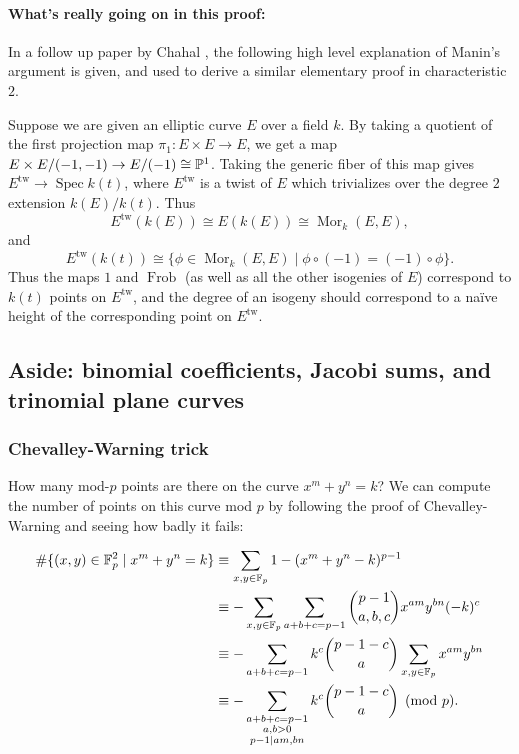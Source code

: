 \documentclass[letterpaper,11pt]{article}
\DeclareMathOperator{\tw}{tw}
\DeclareMathOperator{\Spec}{Spec}
\DeclareMathOperator{\Mor}{Mor}
\DeclareMathOperator{\Frob}{Frob}
\begin{document}
\paragraph{What's really going on in this proof:} In a follow up paper by Chahal \cite{chahal-supplement}, the following high level explanation of Manin's argument is given, and used to derive a similar elementary proof in characteristic $2$.

Suppose we are given an elliptic curve $E$ over a field $k$. By taking a quotient of the first projection map $\pi_1: E\times E \rightarrow E$, we get a map $E\times E/(-1,-1) \rightarrow E/(-1) \cong \mathbb{P}^1$. Taking the generic fiber of this map gives $E^{\tw} \rightarrow \Spec k(t)$, where $E^{\tw}$ is a twist of $E$ which trivializes over the degree $2$ extension $k(E)/k(t)$. Thus
\[
E^{\tw}(k(E)) \cong E(k(E)) \cong \Mor_k(E,E),
\]
and
\[
E^{\tw}(k(t)) \cong \{\phi \in \Mor_k(E,E) \mid \phi\circ(-1) = (-1)\circ\phi\}.
\]
Thus the maps $1$ and $\Frob$ (as well as all the other isogenies of $E$) correspond to $k(t)$ points on $E^{\tw}$, and the degree of an isogeny should correspond to a na\"{i}ve height of the corresponding point on $E^{\tw}$.

\subsection{Aside: binomial coefficients, Jacobi sums, and trinomial plane curves}

\subsubsection{Chevalley-Warning trick}

How many mod-$p$ points are there on the curve $x^m + y^n = k$? We can compute the number of points on this curve mod $p$ by following the proof of Chevalley-Warning and seeing how badly it fails:

\begin{align*}
\#\{(x,y) \in \mathbb{F}_p^2\mid x^m + y^n = k\} &\equiv \sum_{x,y\in \mathbb{F}_p} 1 - (x^m + y^n - k)^{p-1}\\
&\equiv -\sum_{x,y\in\mathbb{F}_p}\sum_{a+b+c=p-1} \binom{p-1}{a,b,c}x^{am}y^{bn}(-k)^c\\
&\equiv -\sum_{a+b+c=p-1}k^c\binom{p-1-c}{a}\sum_{x,y\in\mathbb{F}_p}x^{am}y^{bn}\\
&\equiv -\sum_{\substack{a+b+c=p-1\\a,b>0\\p-1\mid am,bn}}k^c\binom{p-1-c}{a}\pmod{p}.
\end{align*}
\end{document}
